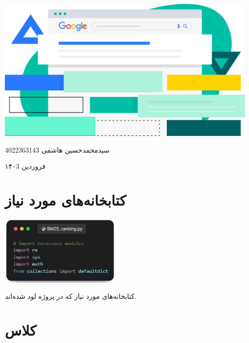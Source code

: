 \documentclass[12pt, dvipsnames, svgnames, x11names,]{article}
\begin{document}
	\begin{titlepage}
		\centering
		\vspace{1cm}
		{\Huge {\textbf{}}\par}
		\vspace{15mm}
		\vspace{16mm}
		\includegraphics[width=13cm]{images/00.png} \par
		\vfill \par	\vfill
		\vspace{16mm}
		{\normalsize	سیدمحمدحسین هاشمی  4022363143 \par}
		\vspace{1cm}
		{\large فروردین ۱۴۰3\par}
	\end{titlepage}
	\tableofcontents
	\newpage
	
		
	
	\section{کتابخانه‌های مورد نیاز}
	
		\begin{center}
			{\includegraphics[width=6cm]{images/01.png}}
		\end{center}
	
		{\normalsize کتابخانه‌های مورد نیاز که در پروژه لود شده‌اند.}
	
	
	
	\section{کلاس }
	
\end{document}

